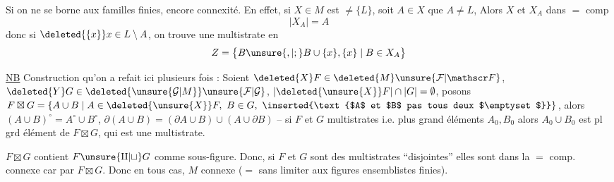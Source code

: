 Si on ne se borne aux familles finies,  encore connexité. En effet, si $X\in M$ est $\ne\{L\}$, soit $A\in X$  que $A\ne L$, Alors $X$ et $X_A$ dans $=$ comp 
\[
\lvert X_A\rvert=A
\]
donc si $\deleted{\{x\}}x\in L\setminus A$, on trouve une multistrate en 
\[
Z=\bigl\{B\unsure{,|;}B\cup\{x\},\{x\}\mid B\in X_A\bigr\}
\]

\uline{NB} Construction qu'on a refait ici plusieurs fois : Soient $\deleted{X}F\in\deleted{M}\unsure{\mathcal F|\mathscr F}$, $\deleted{Y}G\in\deleted{\unsure{\mathcal G|M}}\unsure{\mathcal F|\mathcal G}$, $\lvert\deleted{\unsure{X}}F\rvert\cap\lvert G\rvert=\emptyset$, posons $F\boxtimes G=\{A\cup B\mid A\in\deleted{\unsure{X}}F,\ B\in G,\ \inserted{\text{$A$ et $B$ pas tous deux $\emptyset$}}\}$, alors $(A\cup B)^{\circ}=A^{\circ}\cup B^{\circ}$, $\partial(A\cup B)=(\partial A\cup B)\cup(A\cup\partial B)$ -- si $F$ et $G$   multistrates i.e.   plus grand éléments  $A_0,B_0$ alors $A_0\cup B_0$ est pl grd élément de $F\boxtimes G$, qui est une multistrate.

 $F\boxtimes G$ contient $F\unsure{\amalg|\sqcup}G$ comme sous-figure. Donc, si $F$ et $G$ sont des multistrates ``disjointes'' elles sont dans la $=$ comp. connexe car  par $F\boxtimes G$. Donc en tous cas, \margin{)} $M$ connexe ($=$ sans  limiter aux  figures ensemblistes finies).
